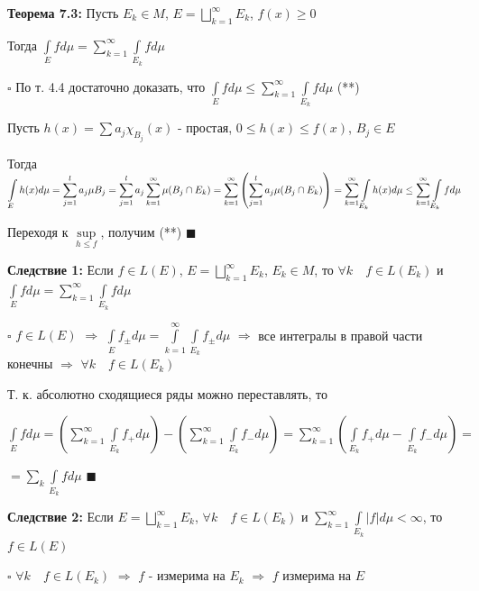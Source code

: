 \documentclass[a4paper]{report}
\newcommand*{\hm}[1]{#1\nobreak\discretionary{}%
            {\hbox{$\mathsurround=0pt #1$}}{}}
\begin{document}
\noindent\textbf{Теорема 7.3:} Пусть $E_k\in M$, $E=\bigsqcup\limits_{k=1}^\infty E_k$, $f(x)\ge0$

Тогда $\displaystyle\int\limits_E fd\mu=\sum\limits_{k=1}^\infty\displaystyle\int\limits_{E_k} fd\mu$

\noindent $\square$ По т. 4.4 достаточно доказать, что $\displaystyle\int\limits_E fd\mu\le\sum\limits_{k=1}^\infty\displaystyle\int\limits_{E_k}fd\mu$ (**)

Пусть $h(x)=\sum a_j\chi_{B_j}(x)$ - простая, $0\le h(x)\le f(x)$, $B_j\in E$


Тогда $\displaystyle\int\limits_E h(x) d\mu=\sum\limits_{j=1}^l a_j\mu B_j=\sum\limits_{j=1}^l a_j\sum\limits_{k=1}^\infty\mu(B_j\cap E_k)=\sum\limits_{k=1}^\infty\left(
\sum\limits_{j=1}^l a_j\mu(B_j\cap E_k)\right)\hm=\sum\limits_{k=1}^\infty\displaystyle\int\limits_{E_k}h(x) d\mu\le\sum\limits_{k=1}^\infty\displaystyle\int\limits_{E_k} fd\mu$

Переходя к $\sup\limits_{h\le f}$, получим (**) $\blacksquare$
\bigskip

\noindent\textbf{Следствие 1:} Если $f\in L(E)$, $E=\bigsqcup\limits_{k=1}^\infty E_k$, $E_k\in M$, то $\forall k\quad f\in L(E_k)$ и $\displaystyle\int\limits_Efd\mu=\sum\limits_{k=1}^\infty\displaystyle\int\limits_{E_k}fd\mu$

\noindent $\square$ $f\in L(E)$ $\Rightarrow$ $\displaystyle\int\limits_E f_\pm d\mu=\displaystyle\int\limits_{k=1}^\infty\displaystyle\int\limits_{E_k}f_\pm d\mu$ $\Rightarrow$ все интегралы в правой части конечны $\Rightarrow$ $\forall k\quad f\in L(E_k)$

Т. к. абсолютно сходящиеся ряды можно переставлять, то 

$\displaystyle\int\limits_E fd\mu=\left(\sum\limits_{k=1}^\infty\displaystyle\int\limits_{E_k} f_+d\mu\right)-\left(\sum\limits_{k=1}^\infty\displaystyle\int\limits_{E_k} f_-d\mu\right)=\sum\limits_{k=1}^\infty\left(\displaystyle\int\limits_{E_k}f_+d\mu-\displaystyle\int\limits_{E_k}f_-d\mu\right)=$

\noindent $=\sum\limits_k\displaystyle\int\limits_{E_k} fd\mu$ $\blacksquare$
\bigskip

\noindent\textbf{Следствие 2:} Если $E=\bigsqcup\limits_{k=1}^\infty E_k$, $\forall k\quad f\in L(E_k)$ и $\sum\limits_{k=1}^\infty\displaystyle\int\limits_{E_k}|f|d\mu<\infty$,
 то $f\in L(E)$

\noindent $\square$ $\forall k\quad f\in L(E_k)$ $\Rightarrow$ $f$ - измерима на $E_k$ $\Rightarrow$ $f$ измерима на $E$
\end{document}
